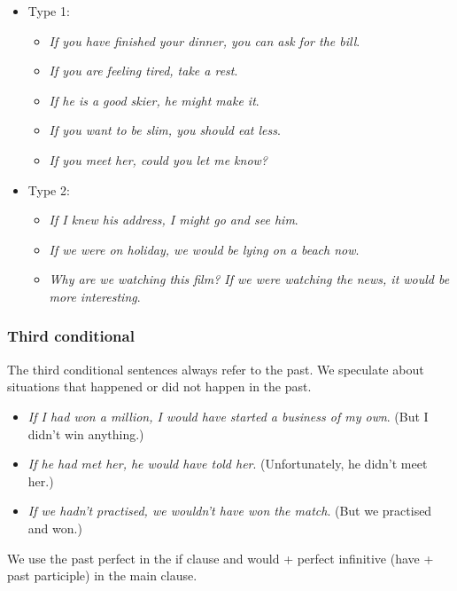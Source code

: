 \begin{itemize}

\item Type 1:

\begin{itemize}
\item \textit{If you have finished your dinner, you can ask for the bill}.
\item \textit{If you are feeling tired, take a rest}.
\item \textit{If he is a good skier, he might make it}.
\item \textit{If you want to be slim, you should eat less}.
\item \textit{If you meet her, could you let me know?}
\end{itemize}

\item Type 2:

\begin{itemize}
\item \textit{If I knew his address, I might go and see him}.
\item \textit{If we were on holiday, we would be lying on a beach now}.
\item \textit{Why are we watching this film? If we were watching the news, it would be more interesting}.
\end{itemize} 

\end{itemize}

\subsubsection{Third conditional}

The third conditional sentences always refer to the past. We speculate about situations that happened or did not happen in the past. 

\begin{itemize}

\item \textit{If I had won a million, I would have started a business of my own}. (But I didn't win anything.)
\item \textit{If he had met her, he would have told her}.  (Unfortunately, he didn't meet her.) 
\item \textit{If we hadn't practised, we wouldn't have won the match}. (But we practised and won.)
\end{itemize} 

We use the past perfect in the if clause and would + perfect infinitive (have + past participle) in the main clause.

